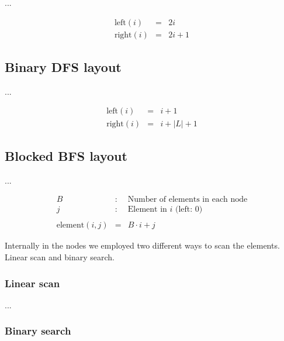 \documentclass[a4paper]{article}
\begin{document}
...

\begin{eqnarray*}
\mathrm{left}(i) & = & 2i \\
\mathrm{right}(i) & = & 2i + 1
\end{eqnarray*}


\subsection{Binary DFS layout}

...

\begin{eqnarray*}
\mathrm{left}(i) & = & i + 1 \\
\mathrm{right}(i) & = & i + |L| + 1
\end{eqnarray*}



\subsection{Blocked BFS layout}

...

\begin{eqnarray*}
B & : & \textrm{Number of elements in each node} \\
j & : & \textrm{Element in $i$ (left: $0$)} \\
\\
\mathrm{element}(i, j) & = & B\cdot i + j
\end{eqnarray*}



Internally in the nodes we employed two different ways to scan the elements. Linear scan and binary search.


\subsubsection{Linear scan}

...

\subsubsection{Binary search}
\end{document}
